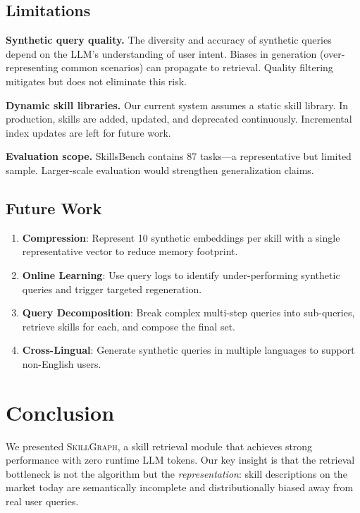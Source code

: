 \documentclass[11pt,a4paper]{article}
\newcommand{\ours}{\textsc{SkillGraph}}
\begin{document}
\subsection{Limitations}

\textbf{Synthetic query quality.} The diversity and accuracy of synthetic queries depend on the LLM's understanding of user intent. Biases in generation (over-representing common scenarios) can propagate to retrieval. Quality filtering mitigates but does not eliminate this risk.

\textbf{Dynamic skill libraries.} Our current system assumes a static skill library. In production, skills are added, updated, and deprecated continuously. Incremental index updates are left for future work.

\textbf{Evaluation scope.} SkillsBench contains 87 tasks---a representative but limited sample. Larger-scale evaluation would strengthen generalization claims.

\subsection{Future Work}

\begin{enumerate}
  \item \textbf{Compression}: Represent 10 synthetic embeddings per skill with a single representative vector to reduce memory footprint.
  \item \textbf{Online Learning}: Use query logs to identify under-performing synthetic queries and trigger targeted regeneration.
  \item \textbf{Query Decomposition}: Break complex multi-step queries into sub-queries, retrieve skills for each, and compose the final set.
  \item \textbf{Cross-Lingual}: Generate synthetic queries in multiple languages to support non-English users.
\end{enumerate}

\section{Conclusion}
\label{sec:conclusion}

We presented \ours{}, a skill retrieval module that achieves strong performance with zero runtime LLM tokens. Our key insight is that the retrieval bottleneck is not the algorithm but the \emph{representation}: skill descriptions on the market today are semantically incomplete and distributionally biased away from real user queries.
\end{document}
